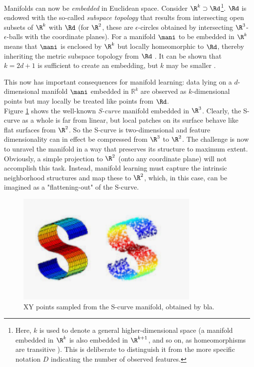 Manifolds can now be \textit{embedded} in Euclidean space.
Consider $\R^k \supset \Rd$\footnote{
Here, $k$ is used to denote a general higher-dimensional space (a manifold
embedded in $\R^k$ is also embedded in $\R^{k + 1}$, and so on, as 
homeomorphisms are transitive \citep{waldmann2014}). 
This is deliberate to distinguish it from the more specific notation $D$ 
indicating the number of observed features.
}.
$\Rd$ is endowed with the so-called \textit{subspace topology} that results
from intersecting open subsets of $\R^k$ with $\Rd$ (for $\R^2$, these are
$\epsilon$-circles obtained by intersecting $\R^3$-$\epsilon$-balls with the 
coordinate planes).
For a manifold $\mani$ to be embedded in $\R^k$ means that $\mani$ is enclosed
by $\R^k$ but locally homeomorphic to $\Rd$, thereby inheriting the metric
subspace topology from $\Rd$ \citep{waldmann2014}.
It can be shown that $k = 2d + 1$ is sufficient to create an embedding, but $k$
may be smaller \citep{mafu2011}.

This now has important consequences for manifold learning: data lying on a 
$d$-dimensional manifold $\mani$ embedded in $\mathbb{R}^k$ are observed as 
$k$-dimensional points but may locally be treated like points from $\Rd$.
\\

Figure \ref{fig:scurve} shows the well-known \textit{S-curve} manifold embedded 
in $\R^3$.
Clearly, the S-curve as a whole is far from linear, but local patches on its
surface behave like flat surfaces from $\R^2$.
So the S-curve is two-dimensional and feature dimensionality can in effect be 
compressed from $\R^3$ to $\R^2$.
The challenge is now to unravel the manifold in a way that preserves its 
structure to maximum extent.
Obviously, a simple projection to $\R^2$ (onto any coordinate plane) will not
accomplish this task.
Instead, manifold learning must capture the intrinsic neighborhood structures
and map these to $\R^2$, which, in this case, can be imagined as a 
"flattening-out" of the S-curve.

\begin{figure}[H]
  \centering
  \includegraphics[width = 0.8\textwidth]{figures/s-curve-screenshot}
  \caption[S-curve manifold]{XY points sampled from the S-curve manifold,
  obtained by bla.}
  \label{fig:scurve}
\end{figure}

